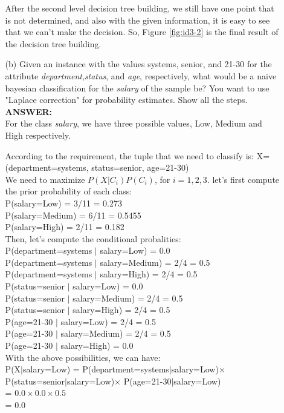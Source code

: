 \documentclass{article}
\begin{document}
\begin{enumerate}
\begin{enumerate}
After the second level decision tree building, we still have one point
that is not determined, and also with the given information, it is
easy to see that we can't make the decision. So, Figure
\ref{fig:id3-2} is the final result of the decision tree building. 

\item[(b)] Given an instance with the values systems, senior, and
  21-30 for the attribute {\it department},{\it status}, and
  {\it age}, respectively, what would be a naive bayesian
  classification for the {\it salary} of the sample be? You want to
  use "Laplace correction" for probability estimates. Show all the
  steps. \\
\textbf{ANSWER:} \\
For the class {\it salary}, we have three possible values, Low, Medium
and High respectively.

According to the requirement, the tuple that we need to classify is:
X=(department=systems, status=senior, age=21-30) \\
We need to maximize $P(X|C_i)P(C_i)$, for $i=1,2,3$. let's first
compute the prior probability of each class: \\
P(salary=Low) = 3/11 = 0.273 \\
P(salary=Medium) = 6/11 = 0.5455\\
P(salary=High) = 2/11 = 0.182\\

Then, let's compute the conditional probalities: \\
P(department=systems $|$ salary=Low) = 0.0 \\
P(department=systems $|$ salary=Medium) = 2/4 = 0.5 \\
P(department=systems $|$ salary=High) = 2/4 = 0.5 \\
P(status=senior $|$ salary=Low) = 0.0 \\
P(status=senior $|$ salary=Medium) = 2/4 = 0.5 \\
P(status=senior $|$ salary=High) = 2/4 = 0.5 \\
P(age=21-30 $|$ salary=Low) = 2/4 = 0.5 \\
P(age=21-30 $|$ salary=Medium) = 2/4 = 0.5 \\
P(age=21-30 $|$ salary=High) = 0.0 \\

With the above possibilities, we can have: \\ 
P(X$|$salary=Low) = P(department=systems$|$salary=Low)$\times$ \\
P(status=senior$|$salary=Low)$\times$ P(age=21-30$|$salary=Low) \\
= $0.0 \times 0.0 \times 0.5$ \\
= 0.0 \\


\end{enumerate}
\end{enumerate}
\end{document}
